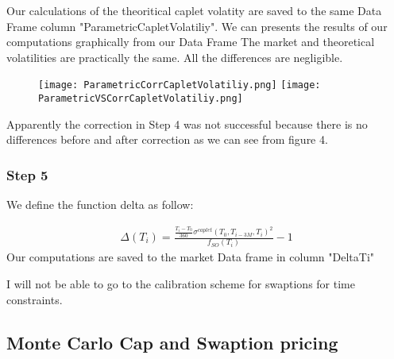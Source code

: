 \documentclass[11pt]{article}
\numberwithin{equation}{subsection}
\begin{document}
Our calculations of the theoritical caplet volatity are saved to the same Data Frame column "ParametricCapletVolatiliy".
We can presents the results of our computations graphically from our Data Frame The market and theoretical volatilities are practically the same. All the differences are negligible.

\begin{figure}[H]
	\texttt{[image: ParametricCorrCapletVolatiliy.png]}
	\texttt{[image: ParametricVSCorrCapletVolatiliy.png]}
\end{figure}

Apparently the correction in Step 4 was not successful because there is no differences before and after correction as we can see from figure 4. 

\subsubsection*{Step 5}
We define the function delta as follow:

\begin{eqnarray*}
	\Delta (T_i) = \frac{\frac{T_i-T_0}{360} \sigma^{caplet}(T_0, T_{i-3M}, T_i)^{2}}{f_{SO}(T_i)}-1
\end{eqnarray*}
Our computations are saved to the market Data frame in column "DeltaTi"

I will not be able to go to the calibration scheme for swaptions for time constraints.

\newpage
\subsection{Monte Carlo Cap and Swaption pricing}
\end{document}
